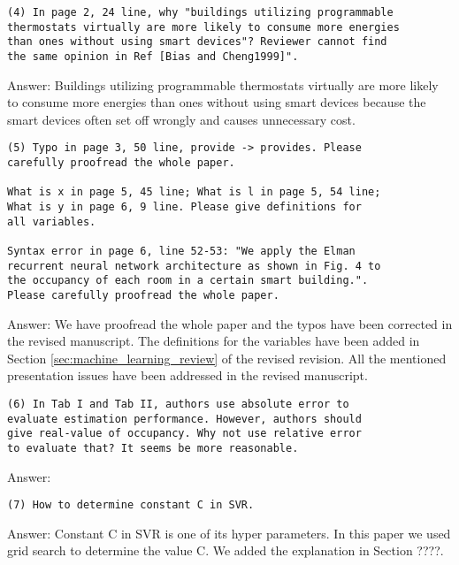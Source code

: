 \begin{verbatim}
(4) In page 2, 24 line, why "buildings utilizing programmable
thermostats virtually are more likely to consume more energies
than ones without using smart devices"? Reviewer cannot find
the same opinion in Ref [Bias and Cheng1999]".
\end{verbatim}
Answer: Buildings utilizing programmable
thermostats virtually are more likely to consume more energies than ones
without using smart devices because the smart devices often set off wrongly
and causes unnecessary cost.

\begin{verbatim}
(5) Typo in page 3, 50 line, provide -> provides. Please
carefully proofread the whole paper.

What is x in page 5, 45 line; What is l in page 5, 54 line;
What is y in page 6, 9 line. Please give definitions for
all variables.

Syntax error in page 6, line 52-53: "We apply the Elman
recurrent neural network architecture as shown in Fig. 4 to
the occupancy of each room in a certain smart building.".
Please carefully proofread the whole paper.
\end{verbatim}
Answer: We have proofread the whole paper and the typos have been corrected in
the revised manuscript. The definitions for the variables have been added in
Section \ref{sec:machine_learning_review} of the revised revision. All the mentioned presentation issues have
been addressed in the revised manuscript.

\begin{verbatim}
(6) In Tab I and Tab II, authors use absolute error to
evaluate estimation performance. However, authors should
give real-value of occupancy. Why not use relative error
to evaluate that? It seems be more reasonable.
\end{verbatim}
Answer:

\begin{verbatim}
(7) How to determine constant C in SVR.
\end{verbatim}
Answer: Constant C in SVR is one of its hyper parameters. In this paper we used
grid search to determine the value C. We added the explanation in Section ????.

